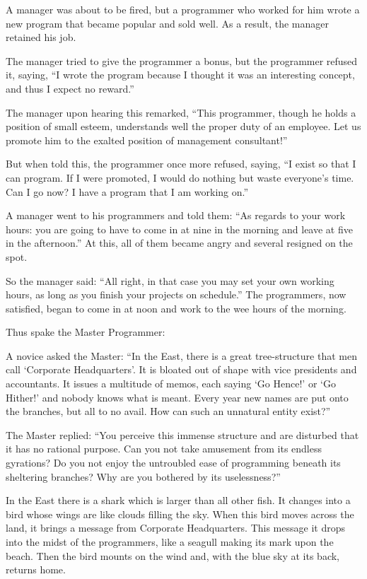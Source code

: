 A manager was about to be fired, but a programmer who worked for him
wrote a new program that became popular and sold well. As a result,
the manager retained his job.

The manager tried to give the programmer a bonus, but the programmer
refused it, saying, ``I wrote the program because I thought it was an
interesting concept, and thus I expect no reward.''

The manager upon hearing this remarked, ``This programmer, though he
holds a position of small esteem, understands well the proper duty of
an employee. Let us promote him to the exalted position of management
consultant!''

But when told this, the programmer once more refused, saying, ``I
exist so that I can program. If I were promoted, I would do nothing
but waste everyone's time. Can I go now? I have a program that I am
working on.''

A manager went to his programmers and told them: ``As regards to your
work hours: you are going to have to come in at nine in the morning
and leave at five in the afternoon.'' At this, all of them became
angry and several resigned on the spot.

So the manager said: ``All right, in that case you may set your own
working hours, as long as you finish your projects on schedule.'' The
programmers, now satisfied, began to come in at noon and work to the
wee hours of the morning.

Thus spake the Master Programmer:

A novice asked the Master: ``In the East, there is a great
tree-structure that men call `Corporate Headquarters'. It is bloated
out of shape with vice presidents and accountants. It issues a
multitude of memos, each saying `Go Hence!' or `Go Hither!' and nobody
knows what is meant. Every year new names are put onto the branches,
but all to no avail. How can such an unnatural entity exist?''

The Master replied: ``You perceive this immense structure and are
disturbed that it has no rational purpose. Can you not take amusement
from its endless gyrations? Do you not enjoy the untroubled ease of
programming beneath its sheltering branches? Why are you bothered by
its uselessness?''

In the East there is a shark which is larger than all other fish. It
changes into a bird whose wings are like clouds filling the sky. When
this bird moves across the land, it brings a message from Corporate
Headquarters. This message it drops into the midst of the programmers,
like a seagull making its mark upon the beach. Then the bird mounts on
the wind and, with the blue sky at its back, returns home.

